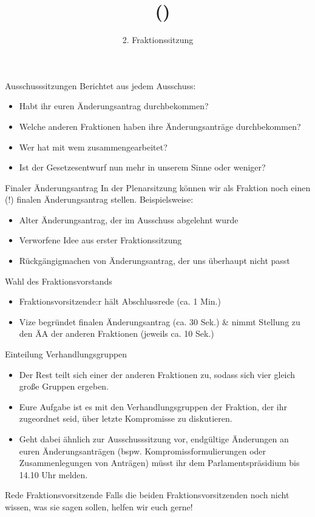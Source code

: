 \documentclass{beamer}
\title{\Fraktionsname\ (\Fraktionskuerzel)}
\subtitle{2. Fraktionssitzung}
\date{\datum}
\begin{document}
\frame{\titlepage}

\begin{frame}{Ausschusssitzungen} %
\vspace{-1.5cm}
Berichtet aus jedem Ausschuss:
\newline
\begin{itemize}
    \item Habt ihr euren Änderungsantrag durchbekommen?
    \item Welche anderen Fraktionen haben ihre Änderungsanträge durchbekommen?
    \item Wer hat mit wem zusammengearbeitet?
    \item Ist der Gesetzesentwurf nun mehr in unserem Sinne oder weniger?
\end{itemize}
\end{frame}

\begin{frame}{Finaler Änderungsantrag} %
\vspace{-0.5cm}
In der Plenarsitzung können wir als Fraktion noch einen (!) finalen Änderungsantrag stellen. Beispielsweise: \newline
\begin{itemize}
    \item Alter Änderungsantrag, der im Ausschuss abgelehnt wurde
    \item Verworfene Idee aus erster Fraktionssitzung
    \item Rückgängigmachen von Änderungsantrag, der uns überhaupt nicht passt
\end{itemize}
\end{frame}

\begin{frame}{Wahl des Fraktionsvorstands}
\vspace{-1.5cm}
\begin{itemize}
    \item Fraktionsvorsitzende:r hält Abschlussrede (ca. 1 Min.)
    \item Vize begründet finalen Änderungsantrag (ca. 30 Sek.) \& nimmt Stellung zu den ÄA der anderen Fraktionen \newline (jeweils ca. 10 Sek.)
\end{itemize} 
\end{frame}

\begin{frame}{Einteilung Verhandlungsgruppen}
\begin{itemize}
    \item Der Rest teilt sich einer der anderen Fraktionen zu, sodass sich vier gleich große Gruppen ergeben.
    \item Eure Aufgabe ist es mit den Verhandlungsgruppen der Fraktion, der ihr zugeordnet seid, über letzte Kompromisse zu diskutieren.
    \item Geht dabei ähnlich zur Ausschusssitzung vor, endgültige Änderungen an euren Änderungsanträgen (bspw. Kompromissformulierungen oder Zusammenlegungen von Anträgen) müsst ihr dem Parlamentspräsidium bis 14.10 Uhr melden.
\end{itemize} 
\end{frame}


\begin{frame}{Rede Fraktionsvorsitzende}
\vspace{-1.5cm}
Falls die beiden Fraktionsvorsitzenden noch nicht wissen, was sie sagen sollen, helfen wir euch gerne!
\end{frame}
\end{document}
